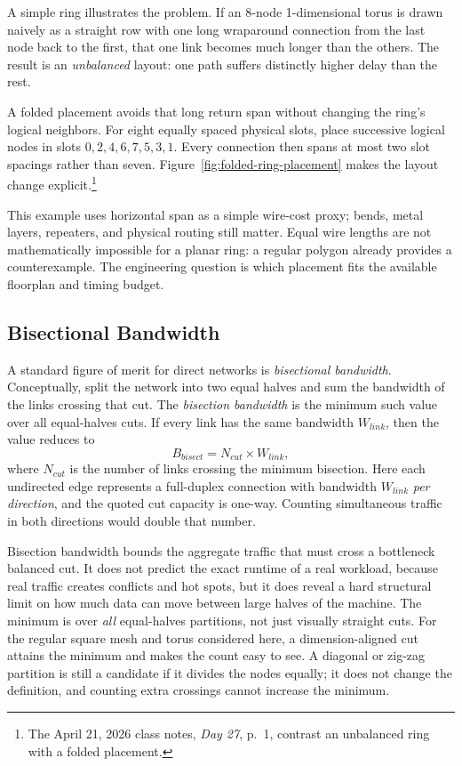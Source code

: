 A simple ring illustrates the problem.
If an 8-node 1-dimensional torus is drawn naively as a straight row with one long wraparound connection from the last node back to the first, that one link becomes much longer than the others.
The result is an \textit{unbalanced} layout: one path suffers distinctly higher delay than the rest.

A folded placement avoids that long return span without changing the ring's logical neighbors.
For eight equally spaced physical slots, place successive logical nodes in slots $0,2,4,6,7,5,3,1$.
Every connection then spans at most two slot spacings rather than seven.
Figure~\ref{fig:folded-ring-placement} makes the layout change explicit.\footnote{The April 21, 2026 class notes, \emph{Day 27}, p.\ 1, contrast an unbalanced ring with a folded placement.}



This example uses horizontal span as a simple wire-cost proxy; bends, metal layers, repeaters, and physical routing still matter.
Equal wire lengths are not mathematically impossible for a planar ring: a regular polygon already provides a counterexample.
The engineering question is which placement fits the available floorplan and timing budget.

\subsection{Bisectional Bandwidth}\label{subsec:pin-bisection}
A standard figure of merit for direct networks is \textit{bisectional bandwidth}.
Conceptually, split the network into two equal halves and sum the bandwidth of the links crossing that cut.
The \textit{bisection bandwidth} is the minimum such value over all equal-halves cuts.
If every link has the same bandwidth $W_{link}$, then the value reduces to
\begin{equation}\label{eq:ch10-formula-bisection}
    B_{bisect}=N_{cut}\times W_{link},
\end{equation}
where $N_{cut}$ is the number of links crossing the minimum bisection.
Here each undirected edge represents a full-duplex connection with bandwidth $W_{link}$ \emph{per direction}, and the quoted cut capacity is one-way.
Counting simultaneous traffic in both directions would double that number.

Bisection bandwidth bounds the aggregate traffic that must cross a bottleneck balanced cut.
It does not predict the exact runtime of a real workload, because real traffic creates conflicts and hot spots, but it does reveal a hard structural limit on how much data can move between large halves of the machine.
The minimum is over \emph{all} equal-halves partitions, not just visually straight cuts.
For the regular square mesh and torus considered here, a dimension-aligned cut attains the minimum and makes the count easy to see.
A diagonal or zig-zag partition is still a candidate if it divides the nodes equally; it does not change the definition, and counting extra crossings cannot increase the minimum.


